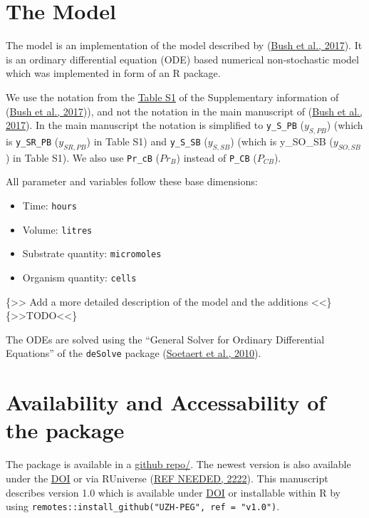 \documentclass[]{elsarticle} %
\providecommand{\tightlist}{%
  \setlength{\itemsep}{0pt}\setlength{\parskip}{0pt}}
\begin{document}
\hypertarget{the-model}{%
\section{The Model}\label{the-model}}

The model is an implementation of the model described by
(\protect\hyperlink{ref-Bush2017}{Bush et al., 2017}). It is an ordinary
differential equation (ODE) based numerical non-stochastic model which
was implemented in form of an R package.

We use the notation from the \href{LINK\%20NEEDED}{Table S1} of the
Supplementary information of (\protect\hyperlink{ref-Bush2017}{Bush et
al., 2017})), and not the notation in the main manuscript of
(\protect\hyperlink{ref-Bush2017}{Bush et al., 2017}). In the main
manuscript the notation is simplified to \texttt{y\_S\_PB}
(\(y_{S,PB}\)) (which is \texttt{y\_SR\_PB} (\(y_{SR,PB}\)) in Table S1)
and \texttt{y\_S\_SB} (\(y_{S,SB}\)) (which is y\_SO\_SB (\(y_{SO,SB}\))
in Table S1). We also use \texttt{Pr\_cB} (\(Pr_B\)) instead of
\texttt{P\_CB} (\(P_{CB}\)).

All parameter and variables follow these base dimensions:

\begin{itemize}
\tightlist
\item
  Time: \texttt{hours}
\item
  Volume: \texttt{litres}
\item
  Substrate quantity: \texttt{micromoles}
\item
  Organism quantity: \texttt{cells}
\end{itemize}

{\{\textgreater\textgreater{} Add a more detailed description of the
model and the additions \textless\textless\}
\{\textgreater\textgreater TODO\textless\textless\}}

The ODEs are solved using the ``General Solver for Ordinary Differential
Equations'' of the \texttt{deSolve} package
(\protect\hyperlink{ref-Soetaert2010}{Soetaert et al., 2010}).

\hypertarget{availability-and-accessability-of-the-package}{%
\section{Availability and Accessability of the
package}\label{availability-and-accessability-of-the-package}}

The package is available in a
\href{https://github.com/UZH-PEG/microxanox/}{github repo/}. The newest
version is also available under the \href{https://DOI}{DOI} or via
RUniverse (\protect\hyperlink{ref-REF_NEEDED}{REF NEEDED, 2222}). This
manuscript describes version 1.0 which is available under
\href{https://DOI}{DOI} or installable within R by using
\texttt{remotes::install\_github("UZH-PEG",\ ref\ =\ "v1.0")}.
\end{document}

